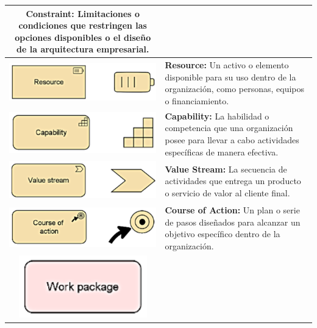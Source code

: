 \begin{longtable}{|c|p{8cm}|}
	\textbf{Constraint:} Limitaciones o condiciones que restringen las opciones disponibles o el diseño de la arquitectura empresarial.                  \\
	\hline
	\includegraphics{anexos/ARCHI/strategy/resource.png}    &
	\textbf{Resource:} Un activo o elemento disponible para su uso dentro de la organización, como personas, equipos o financiamiento.                   \\
	\hline
	\includegraphics{anexos/ARCHI/strategy/capability.png}  &
	\textbf{Capability:} La habilidad o competencia que una organización posee para llevar a cabo actividades específicas de manera efectiva.            \\
	\hline
	\includegraphics{anexos/ARCHI/strategy/stream.png}      &
	\textbf{Value Stream:} La secuencia de actividades que entrega un producto o servicio de valor al cliente final.                                     \\
	\hline
	\includegraphics{anexos/ARCHI/strategy/action.png}      &
	\textbf{Course of Action:} Un plan o serie de pasos diseñados para alcanzar un objetivo específico dentro de la organización.                        \\
	\hline
	\includegraphics{anexos/ARCHI/strategy/work.png}        &

\end{longtable}
